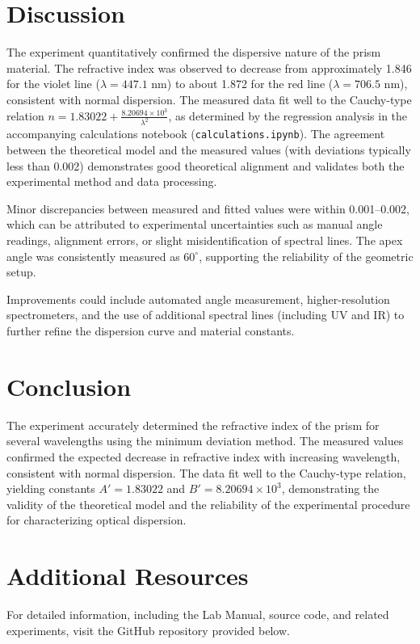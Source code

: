 \documentclass[journal]{IEEEtran}
\begin{document}
\section{Discussion}
The experiment quantitatively confirmed the dispersive nature of the prism material. The refractive index was observed to decrease from approximately 1.846 for the violet line (\( \lambda = 447.1 \) nm) to about 1.872 for the red line (\( \lambda = 706.5 \) nm), consistent with normal dispersion. The measured data fit well to the Cauchy-type relation \( n = 1.83022 + \frac{8.20694 \times 10^3}{\lambda^2} \), as determined by the regression analysis in the accompanying calculations notebook (\texttt{calculations.ipynb}). The agreement between the theoretical model and the measured values (with deviations typically less than 0.002) demonstrates good theoretical alignment and validates both the experimental method and data processing.

Minor discrepancies between measured and fitted values were within 0.001–0.002, which can be attributed to experimental uncertainties such as manual angle readings, alignment errors, or slight misidentification of spectral lines. The apex angle was consistently measured as \( 60^\circ \), supporting the reliability of the geometric setup.

Improvements could include automated angle measurement, higher-resolution spectrometers, and the use of additional spectral lines (including UV and IR) to further refine the dispersion curve and material constants.
\section{Conclusion}
The experiment accurately determined the refractive index of the prism for several wavelengths using the minimum deviation method. The measured values confirmed the expected decrease in refractive index with increasing wavelength, consistent with normal dispersion. The data fit well to the Cauchy-type relation, yielding constants \( A' = 1.83022 \) and \( B' = 8.20694 \times 10^3 \), demonstrating the validity of the theoretical model and the reliability of the experimental procedure for characterizing optical dispersion.

\section{Additional Resources}
For detailed information, including the Lab Manual, source code, and related experiments, visit the GitHub repository provided below.
\end{document}
